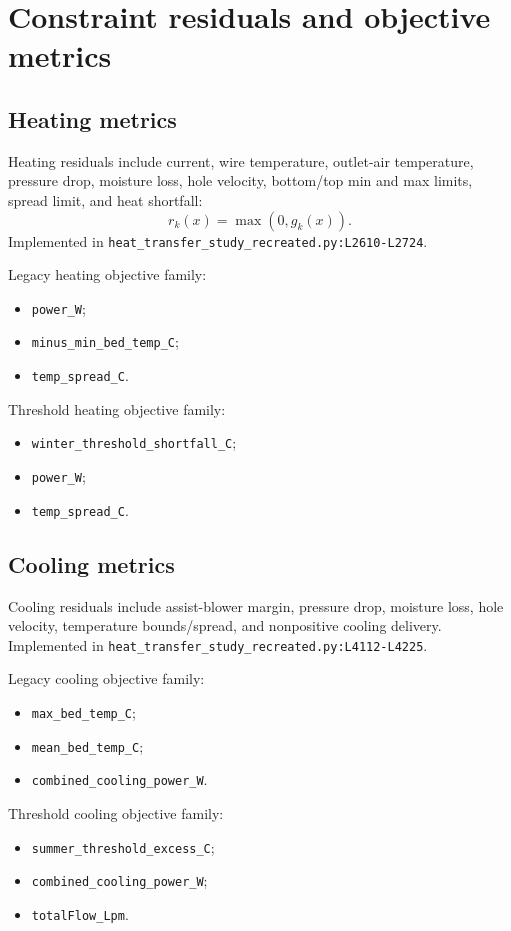 \documentclass[11pt]{article}
\newcommand{\srcref}[1]{\nolinkurl{#1}}
\newcommand{\code}[1]{\nolinkurl{#1}}
\begin{document}
\section{Constraint residuals and objective metrics}
\subsection{Heating metrics}
Heating residuals include current, wire temperature, outlet-air temperature,
pressure drop, moisture loss, hole velocity, bottom/top min and max limits,
spread limit, and heat shortfall:
\begin{equation}
r_k(x)=\max(0,g_k(x)).
\end{equation}
Implemented in \srcref{heat_transfer_study_recreated.py:L2610-L2724}.

Legacy heating objective family:
\begin{itemize}[leftmargin=*]
\item \code{power\_W};
\item \code{minus\_min\_bed\_temp\_C};
\item \code{temp\_spread\_C}.
\end{itemize}

Threshold heating objective family:
\begin{itemize}[leftmargin=*]
\item \code{winter\_threshold\_shortfall\_C};
\item \code{power\_W};
\item \code{temp\_spread\_C}.
\end{itemize}

\subsection{Cooling metrics}
Cooling residuals include assist-blower margin, pressure drop, moisture loss,
hole velocity, temperature bounds/spread, and nonpositive cooling delivery.
Implemented in \srcref{heat_transfer_study_recreated.py:L4112-L4225}.

Legacy cooling objective family:
\begin{itemize}[leftmargin=*]
\item \code{max\_bed\_temp\_C};
\item \code{mean\_bed\_temp\_C};
\item \code{combined\_cooling\_power\_W}.
\end{itemize}

Threshold cooling objective family:
\begin{itemize}[leftmargin=*]
\item \code{summer\_threshold\_excess\_C};
\item \code{combined\_cooling\_power\_W};
\item \code{totalFlow\_Lpm}.
\end{itemize}
\end{document}
